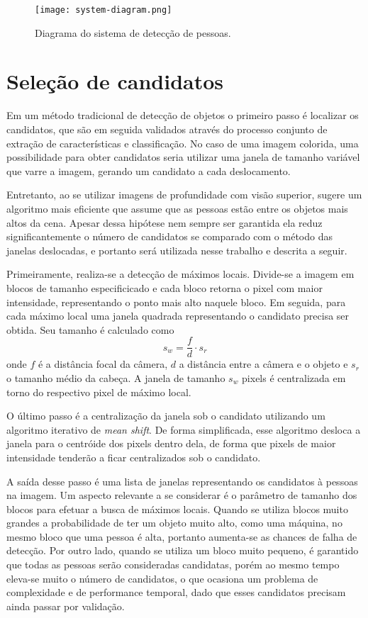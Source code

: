  \begin{figure*}[!t]
  \centering
  \texttt{[image: system-diagram.png]}
  \caption{Diagrama do sistema de detecção de pessoas.}
  \label{fig:system-diagram}
  \end{figure*}

\section{Seleção de candidatos}
\label{sec:candidates}

    Em um método tradicional de detecção de objetos \cite{traditional-objdetect} o primeiro passo é localizar os candidatos, que são em seguida validados através do processo conjunto de extração de características e classificação. No caso de uma imagem colorida, uma possibilidade para obter candidatos seria utilizar uma janela de tamanho variável que varre a imagem, gerando um candidato a cada deslocamento.

    Entretanto, ao se utilizar imagens de profundidade com visão superior, \cite{rauter} sugere um algoritmo mais eficiente que assume que as pessoas estão entre os objetos mais altos da cena. Apesar dessa hipótese nem sempre ser garantida ela reduz significantemente o número de candidatos se comparado com o método das janelas deslocadas, e portanto será utilizada nesse trabalho e descrita a seguir.

    Primeiramente, realiza-se a detecção de máximos locais. Divide-se a imagem em blocos de tamanho especificicado e cada bloco retorna o pixel com maior intensidade, representando o ponto mais alto naquele bloco. Em seguida, para cada máximo local uma janela quadrada representando o candidato precisa ser obtida. Seu tamanho é calculado como
    \begin{equation}
      s_w = \frac{f}{d} \cdot s_r
    \end{equation}
    onde $f$ é a distância focal da câmera, $d$ a distância entre a câmera e o objeto e $s_r$ o tamanho médio da cabeça. A janela de tamanho $s_w$ pixels é centralizada em torno do respectivo pixel de máximo local.

    O último passo é a centralização da janela sob o candidato utilizando um algoritmo iterativo de \textit{mean shift}. De forma simplificada, esse algoritmo desloca a janela para o centróide dos pixels dentro dela, de forma que pixels de maior intensidade tenderão a ficar centralizados sob o candidato.

    A saída desse passo é uma lista de janelas representando os candidatos à pessoas na imagem. Um aspecto relevante a se considerar é o parâmetro de tamanho dos blocos para efetuar a busca de máximos locais. Quando se utiliza blocos muito grandes a probabilidade de ter um objeto muito alto, como uma máquina, no mesmo bloco que uma pessoa é alta, portanto aumenta-se as chances de falha de detecção. Por outro lado, quando se utiliza um bloco muito pequeno, é garantido que todas as pessoas serão consideradas candidatas, porém ao mesmo tempo eleva-se muito o número de candidatos, o que ocasiona um problema de complexidade e de performance temporal, dado que esses candidatos precisam ainda passar por validação.

